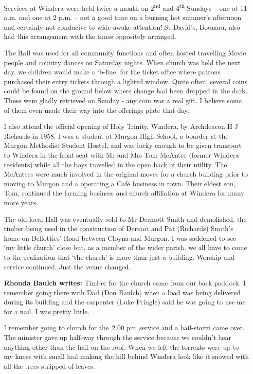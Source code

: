 Services at Windera were held twice a month on 2\textsuperscript{nd} and 4\textsuperscript{th} Sundays -- one at 11 a.m. and one at 2 p.m. -- not a good time on a burning hot summer's afternoon and certainly not conducive to wide-awake attention! St David's, Boonara, also had this arrangement with the times oppositely arranged.

The Hall was used for all community functions and often hosted travelling Movie people and country dances on Saturday nights. When church was held the next day, we children would make a `b-line' for the ticket office where patrons purchased their entry tickets through a lighted window. Quite often, several coins could be found on the ground below where change had been dropped in the dark. These were gladly retrieved on Sunday - any coin was a real gift. I believe some of them even made their way into the offerings plate that day.

I also attend the official opening of Holy Trinity, Windera, by Archdeacon H J Richards in 1958. I was a student at Murgon High School, a boarder at the Murgon Methodist Student Hostel, and was lucky enough to be given transport to Windera in the front seat with Mr and Mrs Tom McAntee (former Windera residents) while all the boys travelled in the open back of their utility. The McAntees were much involved in the original moves for a church building prior to moving to Murgon and a operating a Café business in town. Their eldest son, Tom, continued the farming business and church affiliation at Windera for many more years.

The old local Hall was eventually sold to Mr Dermott Smith and demolished, the timber being used in the construction of Dermot and Pat (Richards) Smith's home on Bellotties' Road between Cloyna and Murgon. I was saddened to see `my little church' close but, as a member of the wider parish, we all have to come to the realization that `the church' is more than just a building. Worship and service continued. Just the venue changed.

\textbf{Rhonda Baulch writes:} Timber for the church came from our back paddock. I remember going there with Dad (Don Baulch) when a load was being delivered during its building and the carpenter (Luke Pringle) said he was going to use me for a nail. I was pretty little.

I remember going to church for the~2.00 pm~service and a hail-storm came over. The minister gave up half-way through the service because we couldn't hear anything other than the hail on the roof. When we left the torrents were up to my knees with small hail making the hill behind Windera look like it snowed with all the trees stripped of leaves.

